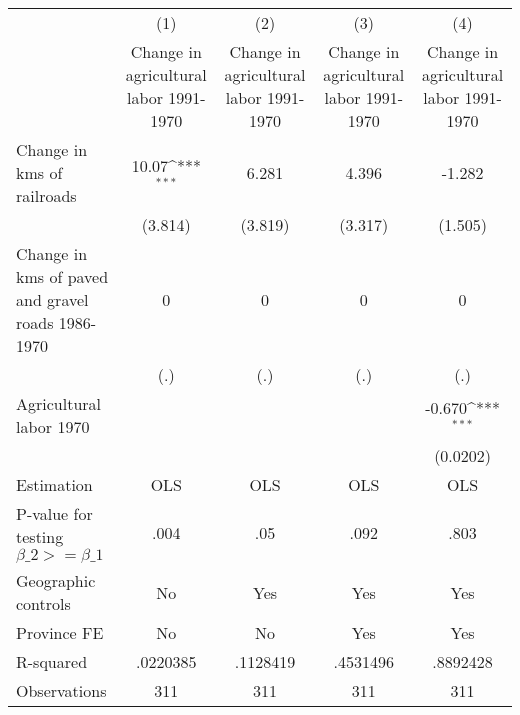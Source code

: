 {
\def\sym#1{\ifmmode^{#1}\else\(^{#1}\)\fi}
\begin{tabular}{l*{4}{c}}
\hline\hline
                &\multicolumn{1}{c}{(1)}&\multicolumn{1}{c}{(2)}&\multicolumn{1}{c}{(3)}&\multicolumn{1}{c}{(4)}\\
                &\multicolumn{1}{c}{Change in agricultural labor 1991-1970}&\multicolumn{1}{c}{Change in agricultural labor 1991-1970}&\multicolumn{1}{c}{Change in agricultural labor 1991-1970}&\multicolumn{1}{c}{Change in agricultural labor 1991-1970}\\
\hline
Change in kms of railroads&    10.07\sym{***}&    6.281         &    4.396         &   -1.282         \\
                &  (3.814)         &  (3.819)         &  (3.317)         &  (1.505)         \\
[1em]
Change in kms of paved and gravel roads 1986-1970&        0         &        0         &        0         &        0         \\
                &      (.)         &      (.)         &      (.)         &      (.)         \\
[1em]
Agricultural labor 1970&                  &                  &                  &   -0.670\sym{***}\\
                &                  &                  &                  & (0.0202)         \\
\hline
Estimation      &      OLS         &      OLS         &      OLS         &      OLS         \\
P-value for testing $\beta\_2 >= \beta\_1$&     .004         &      .05         &     .092         &     .803         \\
Geographic controls&       No         &      Yes         &      Yes         &      Yes         \\
Province FE     &       No         &       No         &      Yes         &      Yes         \\
R-squared       & .0220385         & .1128419         & .4531496         & .8892428         \\
Observations    &      311         &      311         &      311         &      311         \\
\hline\hline
\end{tabular}
}
